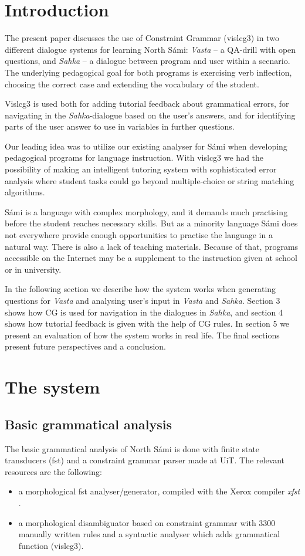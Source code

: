 \documentclass[11pt]{article}
\begin{document}
\section{Introduction} 

The present paper discusses the use of Constraint Grammar (vislcg3) in two different dialogue systems for learning North Sámi: \textit{Vasta} -- a QA-drill with open questions, and \textit{Sahka} -- a  dialogue between program and user within a scenario. The underlying pedagogical goal for both programs is exercising verb inflection, choosing the correct case and extending the vocabulary of the student. 

Vislcg3 is used both for adding tutorial feedback about grammatical errors, for navigating in the \textit{Sahka}-dialogue based on the user's answers, and for identifying parts of the user answer to use in variables in further questions. 

Our leading idea was to utilize our existing analyser for Sámi when developing pedagogical programs for language instruction. With vislcg3 we had the possibility of making an intelligent tutoring system with sophisticated error analysis where student tasks could go beyond multiple-choice or string matching algorithms. 

Sámi is a language with complex morphology, and it demands much practising before the student reaches necessary skills. But as a minority language Sámi does not everywhere provide enough opportunities to practise the language in a natural way. There is also a lack of teaching materials. Because of that, programs accessible on the Internet may be a supplement to the instruction given at school or in university. 

In the following section we describe how the system works when generating questions for \textit{Vasta} and analysing user's input in \textit{Vasta} and \textit{Sahka}. Section 3 shows how CG is used for navigation in the dialogues in \textit{Sahka}, and section 4 shows how tutorial feedback is given with the help of CG rules. In section 5 we present an evaluation of how the system works in real life. The final sections present future perspectives and a conclusion.

\section{The system}
\subsection{Basic grammatical analysis}
The basic grammatical analysis of North Sámi is done with finite state transducers (fst) and a constraint grammar parser made at UiT. The relevant resources are the following:
\begin{itemize}
\item a morphological  fst analyser/generator, compiled with the Xerox compiler \textit{xfst} \cite{BeesleyKarttunen:03}.  
\item a morphological disambiguator based on constraint grammar with 3300 manually written rules and a syntactic analyser which adds grammatical function (vislcg3). 
\end{itemize} 
\end{document}
